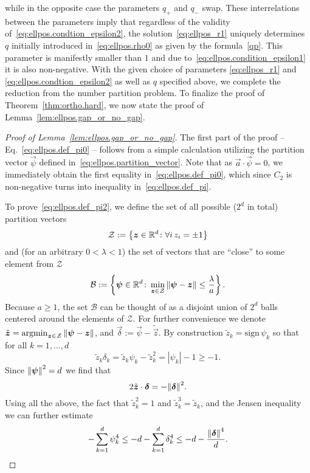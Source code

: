 while in the opposite case the parameters $q_{+}$ and $q_{-}$ swap.
These interrelations between the parameters imply that regardless of the validity of~\eqref{eq:ellpos.condtion_epsilon2}, the solution~\eqref{eq:ellpos_r1} uniquely determines  $q$ initially introduced in~\eqref{eq:ellpos.rho0} as given by the formula~\eqref{qp}. This parameter is manifestly smaller than $1$ and due to~\eqref{eq:ellpos.condition_epsilon1} it is also non-negative.
With the given choice of parameters \eqref{eq:ellpos_r1} and \eqref{eq:ellpos.condtion_epsilon2} as well as $q$ specified above, we complete the reduction from the number partition problem.
To finalize the proof of Theorem~\ref{thm:ortho.hard}, we now state the proof of Lemma~\ref{lem:ellpos.gap_or_no_gap}.
\begin{proof}[Proof of Lemma~\ref{lem:ellpos.gap_or_no_gap}]
  The first part of the proof -- Eq.~\eqref{eq:ellpos.def_pi0} --  follows from a simple calculation utilizing the partition vector $\vec\psi$ defined in~\eqref{eq:ellpos.partition_vector}. Note that as $\vec a \cdot\vec \psi=0$, we immediately obtain the first equality in~\eqref{eq:ellpos.def_pi0}, which since $C_2$ is non-negative turns into inequality in~\eqref{eq:ellpos.def_pi}.

  To prove~\eqref{eq:ellpos.def_pi2}, we define the set of all possible ($2^d$ in total) partition vectors
  \[
    \mathcal{Z} := \left\{ {\boldsymbol{z}} \in {\mathbb{R}}^d\colon \forall i \, z_i = \pm 1 \right\}
  \]
  and (for an arbitrary $0<\lambda<1$) the set of vectors that are ``close'' to some element from $\mathcal{Z}$
  \[
    \mathcal{B} := \left\{ {\boldsymbol{\psi}}\in{\mathbb{R}}^d\colon \min_{{\boldsymbol{z}}\in \mathcal{Z}} {\Vert{\boldsymbol{\psi}} - {\boldsymbol{z}}\Vert} \leq \frac{\lambda}{a} \right\}.
  \]
  Because $a \geq 1$, the set $\mathcal{B}$ can be thought of as a disjoint union of $2^d$ balls centered around the elements of $\mathcal{Z}$.
  For further convenience we denote $\tilde{{\boldsymbol{z}}} = \mathrm{argmin}_{{\boldsymbol{z}}\in\mathcal{Z}} \, {\Vert{\boldsymbol{\psi}} - {\boldsymbol{z}}\Vert}$, and $\vec\delta := \vec\psi - \tilde{\vec{z}}$.
  By construction $\tilde{z}_k=\mathrm{sign}\,\psi_k$ so that for all $k=1,\ldots,d$
  \[
    \tilde{z}_k\delta_k=\tilde{z}_k\psi_k-\tilde{z}_k^2=|\psi_k|-1\geq-1.
  \]
  Since ${\Vert{\boldsymbol{\psi}}\Vert}^2=d$ we find that
  \[
    2\tilde{{\boldsymbol{z}}} \cdot{\boldsymbol{\delta}} = - {\Vert{\boldsymbol{\delta}}\Vert}^2.
  \]
  Using all the above, the fact that $\tilde{z}_k^2=1$ and  $\tilde{z}_k^3=\tilde{z}_k$, and the Jensen inequality we can further estimate
  \[
    -\sum_{k=1}^d \psi_k^4\leq-d-\sum_{k=1}^d \delta_k^4\leq-d-\frac{{\Vert{\boldsymbol{\delta}}\Vert}^4}{d}.
  \]


\end{proof}
